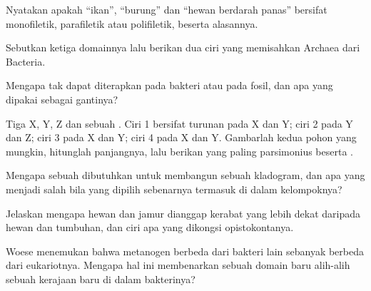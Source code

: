 \begin{exercise}[$\star$]\label{exo:b1:classifying-biodiversity:3}
Nyatakan apakah ``ikan'', ``burung'' dan ``hewan berdarah panas''
bersifat monofiletik, parafiletik atau polifiletik, beserta alasannya.
\end{exercise}

\begin{exercise}[$\star$]\label{exo:b1:classifying-biodiversity:4}
Sebutkan ketiga domainnya lalu berikan dua ciri yang memisahkan
Archaea dari Bacteria.
\end{exercise}

\begin{exercise}[$\star\star$]\label{exo:b1:classifying-biodiversity:5}
Mengapa  tak dapat diterapkan pada bakteri atau
pada fosil, dan apa yang dipakai sebagai gantinya?
\end{exercise}

\begin{exercise}[$\star\star$]\label{exo:b1:classifying-biodiversity:6}
Tiga  X, Y, Z dan sebuah . Ciri 1 bersifat turunan
pada X dan Y; ciri 2 pada Y dan Z; ciri 3 pada X dan Y; ciri 4 pada X
dan Y. Gambarlah kedua pohon yang mungkin, hitunglah panjangnya, lalu
berikan yang paling parsimonius beserta .
\end{exercise}

\begin{exercise}[$\star\star$]\label{exo:b1:classifying-biodiversity:7}
Mengapa sebuah  dibutuhkan untuk membangun sebuah
kladogram, dan apa yang menjadi salah bila  yang dipilih
sebenarnya termasuk di dalam kelompoknya?
\end{exercise}

\begin{exercise}[$\star\star$]\label{exo:b1:classifying-biodiversity:8}
Jelaskan mengapa hewan dan jamur dianggap kerabat yang lebih dekat
daripada hewan dan tumbuhan, dan ciri apa yang dikongsi opistokontanya.
\end{exercise}

\begin{exercise}[$\star\star$]\label{exo:b1:classifying-biodiversity:9}
Woese menemukan bahwa metanogen berbeda dari bakteri lain sebanyak
berbeda dari eukariotnya. Mengapa hal ini membenarkan sebuah domain
baru alih-alih sebuah kerajaan baru di dalam bakterinya?
\end{exercise}

